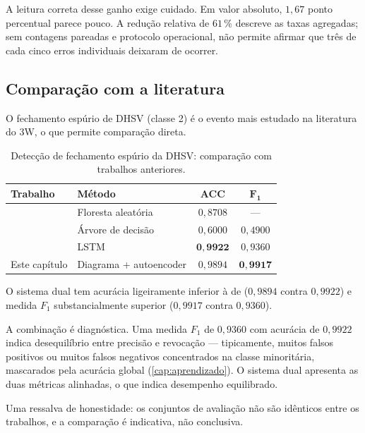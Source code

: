 A leitura correta desse ganho exige cuidado. Em valor absoluto, $1{,}67$ ponto
percentual parece pouco. A redução relativa de $61\,\%$ descreve as taxas agregadas; sem
contagens pareadas e protocolo operacional, não permite afirmar que três de cada cinco
erros individuais deixaram de ocorrer.

\subsection{Comparação com a literatura}

O fechamento espúrio de DHSV (classe 2) é o evento mais estudado na literatura do 3W,
o que permite comparação direta.

\begin{table}[htbp]
\centering
\caption{Detecção de fechamento espúrio da DHSV: comparação com trabalhos anteriores.}
\label{tab:dual-literatura}
\begin{tabular}{llcc}
\toprule
\textbf{Trabalho} & \textbf{Método} & \textbf{ACC} & $\bm{F_1}$ \\
\midrule
\citet{Marins2021}  & Floresta aleatória      & $0{,}8708$ & --- \\
\citet{Turan2021}   & Árvore de decisão       & $0{,}6000$ & $0{,}4900$ \\
\citet{Machado2022} & LSTM                    & $\bm{0{,}9922}$ & $0{,}9360$ \\
Este capítulo       & Diagrama + autoencoder  & $0{,}9894$ & $\bm{0{,}9917}$ \\
\bottomrule
\end{tabular}
\end{table}

\begin{destaque}
O sistema dual tem acurácia ligeiramente inferior à de \citet{Machado2022}
($0{,}9894$ contra $0{,}9922$) e medida $F_1$ substancialmente superior
($0{,}9917$ contra $0{,}9360$).

A combinação é diagnóstica. Uma medida $F_1$ de $0{,}9360$ com acurácia de $0{,}9922$
indica desequilíbrio entre precisão e revocação --- tipicamente, muitos falsos
positivos ou muitos falsos negativos concentrados na classe minoritária, mascarados
pela acurácia global (\cref{cap:aprendizado}). O sistema dual apresenta as duas métricas
alinhadas, o que indica desempenho equilibrado.

Uma ressalva de honestidade: os conjuntos de avaliação não são idênticos entre os
trabalhos, e a comparação é indicativa, não conclusiva.
\end{destaque}

